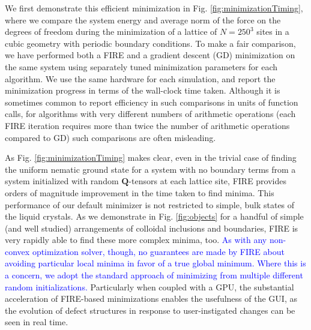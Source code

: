 \documentclass[utf8]{frontiersFPHY} %
\newcommand{\DMS}[1]{\textcolor{blue}{#1}}
\newcommand{\Q}{\mathbf{Q}}
\begin{document}
We first demonstrate this efficient minimization in Fig. \ref{fig:minimizationTiming}, where we compare the system energy and average norm of the force on the degrees of freedom during the minimization of a lattice of $N=250^3$ sites in a cubic geometry with periodic boundary conditions. To make a fair comparison, we have performed both a FIRE and a gradient descent (GD) minimization on the same system using separately tuned minimization parameters for each algorithm. We use the same hardware for each simulation, and report the minimization progress in terms of the wall-clock time taken. Although it is sometimes common to report efficiency in such comparisons in units of function calls, for algorithms with very different numbers of arithmetic operations (each FIRE iteration requires more than twice the number of arithmetic operations compared to GD) such comparisons are often misleading.

As Fig.  \ref{fig:minimizationTiming} makes clear, even in the trivial case of finding the uniform nematic ground state for a system with no boundary terms from a system initialized with random $\Q$-tensors at each lattice site, FIRE provides orders of magnitude improvement in the time taken to find minima. This performance of our default minimizer is not restricted to simple, bulk states of the liquid crystals. As we demonstrate in Fig. \ref{fig:objects} for a handful of simple (and well studied) arrangements of colloidal inclusions and boundaries, FIRE is very rapidly able to find these more complex minima, too. \DMS{As with any non-convex optimization solver, though, no guarantees are made by FIRE about avoiding particular local minima in favor of a true global minimum. Where this is a concern, we adopt the standard approach of minimizing from multiple different random initializations.} Particularly when coupled with a GPU, the substantial acceleration of FIRE-based minimizations enables the usefulness of the GUI, as the evolution of defect structures in response to user-instigated changes can be seen in real time.
\end{document}
